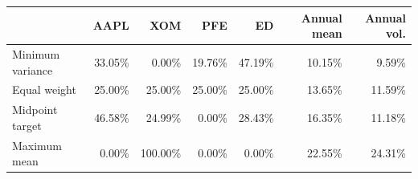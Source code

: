 \begin{tabular}{lrrrrrr}
\toprule
 & AAPL & XOM & PFE & ED & Annual mean & Annual vol. \\
\midrule
Minimum variance & 33.05\% & 0.00\% & 19.76\% & 47.19\% & 10.15\% & 9.59\% \\
Equal weight & 25.00\% & 25.00\% & 25.00\% & 25.00\% & 13.65\% & 11.59\% \\
Midpoint target & 46.58\% & 24.99\% & 0.00\% & 28.43\% & 16.35\% & 11.18\% \\
Maximum mean & 0.00\% & 100.00\% & 0.00\% & 0.00\% & 22.55\% & 24.31\% \\
\bottomrule
\end{tabular}
